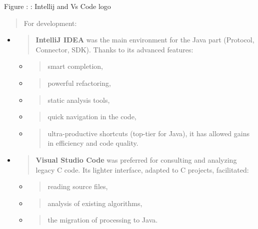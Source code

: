\documentclass[12pt,a4paper]{report}
\begin{document}
\protect\hypertarget{_Toc201954549}{}{}Figure : : Intellij and Vs Code
logo

\begin{quote}
For development:
\end{quote}

\begin{itemize}
\item
  \begin{quote}
  \textbf{IntelliJ IDEA} was the main environment for the Java part
  (Protocol, Connector, SDK). Thanks to its advanced features:
  \end{quote}

  \begin{itemize}
  \item
    \begin{quote}
    smart completion,
    \end{quote}
  \item
    \begin{quote}
    powerful refactoring,
    \end{quote}
  \item
    \begin{quote}
    static analysis tools,
    \end{quote}
  \item
    \begin{quote}
    quick navigation in the code,
    \end{quote}
  \item
    \begin{quote}
    ultra-productive shortcuts (top-tier for Java), it has allowed gains
    in efficiency and code quality.
    \end{quote}
  \end{itemize}
\item
  \begin{quote}
  \textbf{Visual Studio Code} was preferred for consulting and analyzing
  legacy C code. Its lighter interface, adapted to C projects,
  facilitated:
  \end{quote}

  \begin{itemize}
  \item
    \begin{quote}
    reading source files,
    \end{quote}
  \item
    \begin{quote}
    analysis of existing algorithms,
    \end{quote}
  \item
    \begin{quote}
    the migration of processing to Java.
    \end{quote}
  \end{itemize}
\end{itemize}
\end{document}
